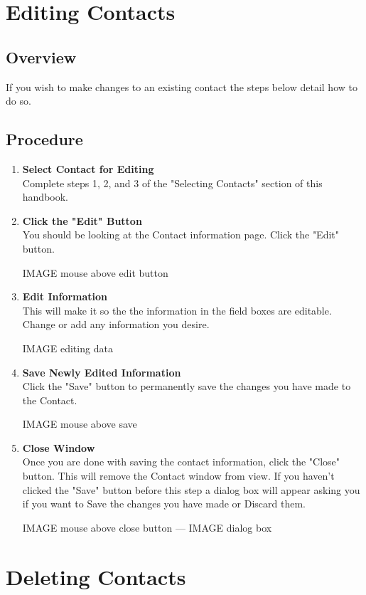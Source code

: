 \documentclass[a4paper, 11pt]{article}
\begin{document}
\section{Editing Contacts}
\subsection{Overview}
If you wish to make changes to an existing contact the steps below detail how to do so.
\subsection{Procedure}
\begin{enumerate}[label=\textbf{\arabic*})]
    \item{\textbf{Select Contact for Editing}}\\ Complete steps 1, 2, and 3 of the "Selecting Contacts" section of this handbook. 
    
    \item{\textbf{Click the "Edit" Button}}\\ You should be looking at the Contact information page. Click the "Edit" button.
    
    IMAGE mouse above edit button
    
    \item{\textbf{Edit Information}}\\ This will make it so the the information in the field boxes are editable. Change or add any information you desire. 
    
    IMAGE editing data
    
    \item{\textbf{Save Newly Edited Information}}\\ Click the "Save" button to permanently save the changes you have made to the Contact. 
    
    IMAGE mouse above save
    
    \item{\textbf{Close Window}}\\ Once you are done with saving the contact information, click the "Close" button. This will remove the Contact window from view. If you haven't clicked the "Save" button before this step a dialog box will appear asking you if you want to Save the changes you have made or Discard them.
    
    IMAGE mouse above close button --- IMAGE dialog box
\end{enumerate}


\section{Deleting Contacts}
\end{document}
